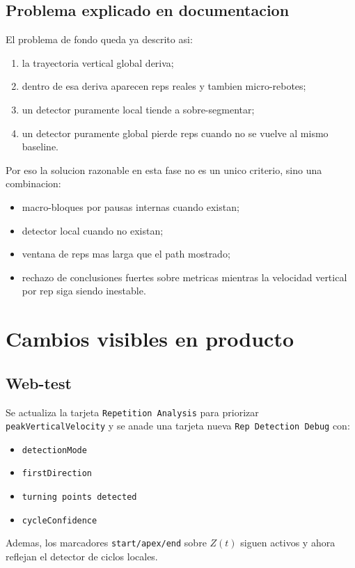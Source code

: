 ﻿\documentclass[11pt,a4paper]{article}
\begin{document}
\subsection*{Problema explicado en documentacion}
El problema de fondo queda ya descrito asi:
\begin{enumerate}[leftmargin=16pt]
  \item la trayectoria vertical global deriva;
  \item dentro de esa deriva aparecen reps reales y tambien micro-rebotes;
  \item un detector puramente local tiende a sobre-segmentar;
  \item un detector puramente global pierde reps cuando no se vuelve al mismo baseline.
\end{enumerate}

Por eso la solucion razonable en esta fase no es un unico criterio, sino una combinacion:
\begin{itemize}[leftmargin=14pt]
  \item macro-bloques por pausas internas cuando existan;
  \item detector local cuando no existan;
  \item ventana de reps mas larga que el path mostrado;
  \item rechazo de conclusiones fuertes sobre metricas mientras la velocidad vertical por rep siga siendo inestable.
\end{itemize}

\section{Cambios visibles en producto}
\subsection*{Web-test}
Se actualiza la tarjeta \texttt{Repetition Analysis} para priorizar \texttt{peakVerticalVelocity} y se anade una tarjeta nueva \texttt{Rep Detection Debug} con:
\begin{itemize}[leftmargin=14pt]
  \item \texttt{detectionMode}
  \item \texttt{firstDirection}
  \item \texttt{turning points detected}
  \item \texttt{cycleConfidence}
\end{itemize}

Ademas, los marcadores \texttt{start/apex/end} sobre \(Z(t)\) siguen activos y ahora reflejan el detector de ciclos locales.
\end{document}
